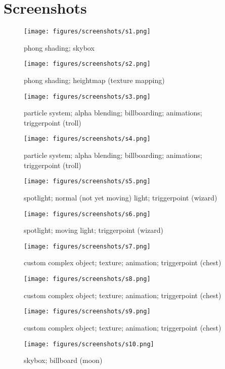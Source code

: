 \section{Screenshots} \label{sec:screenshots}
\begin{figure}[h]
	\centering
	\texttt{[image: figures/screenshots/s1.png]}
	\caption{phong shading; skybox}
\end{figure}

\begin{figure}[h]
	\centering
	\texttt{[image: figures/screenshots/s2.png]}
	\caption{phong shading; heightmap (texture mapping)}
\end{figure}

\begin{figure}[h]
	\centering
	\texttt{[image: figures/screenshots/s3.png]}
	\caption{particle system; alpha blending; billboarding; animations; triggerpoint (troll)}
\end{figure}

\begin{figure}[h]
	\centering
	\texttt{[image: figures/screenshots/s4.png]}
	\caption{particle system; alpha blending; billboarding; animations; triggerpoint (troll)}
\end{figure}

\begin{figure}[h]
	\centering
	\texttt{[image: figures/screenshots/s5.png]}
	\caption{spotlight; normal (not yet moving) light; triggerpoint (wizard)}
\end{figure}

\begin{figure}[h]
	\centering
	\texttt{[image: figures/screenshots/s6.png]}
	\caption{spotlight; moving light; triggerpoint (wizard)}
\end{figure}

\begin{figure}[h]
	\centering
	\texttt{[image: figures/screenshots/s7.png]}
	\caption{custom complex object; texture; animation; triggerpoint (chest)}
\end{figure}

\begin{figure}[h]
	\centering
	\texttt{[image: figures/screenshots/s8.png]}
	\caption{custom complex object; texture; animation; triggerpoint (chest)}
\end{figure}

\begin{figure}[h]
	\centering
	\texttt{[image: figures/screenshots/s9.png]}
	\caption{custom complex object; texture; animation; triggerpoint (chest)}
\end{figure}

\begin{figure}[h]
	\centering
	\texttt{[image: figures/screenshots/s10.png]}
	\caption{skybox; billboard (moon)}
\end{figure}

